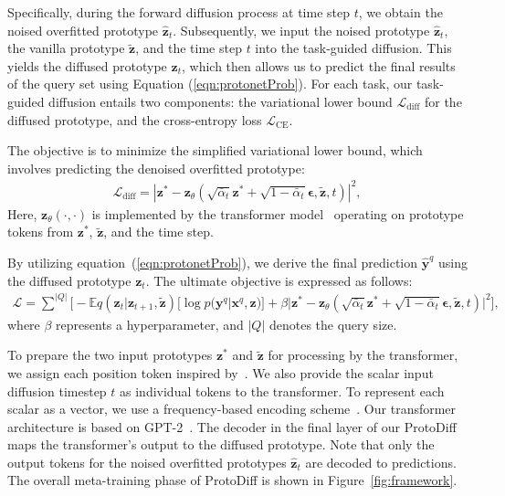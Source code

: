 Specifically, during the forward diffusion process at time step $t$, we obtain the noised overfitted prototype $\hat{\mathbf{z}}_t$. Subsequently, we input the noised prototype $\hat{\mathbf{z}}_t$, the vanilla prototype $\tilde{\mathbf{z}}$, and the time step $t$ into the task-guided diffusion. This yields the diffused prototype $\mathbf{z}_t$, which then allows us to predict the final results of the query set using Equation (\ref{eqn:protonetProb}). For each task, our task-guided diffusion entails two components: the variational lower bound $\mathcal{L}_{\mathrm{diff}}$ for the diffused prototype, and the cross-entropy loss $\mathcal{L}_{\mathrm{CE}}$.

The objective is to minimize the simplified variational lower bound, which involves predicting the denoised overfitted prototype:
\begin{align}
\label{eq:vlb}
\mathcal{L}_{\mathrm{diff}} = |\mathbf{z}^* - \mathbf{z}_\theta(\sqrt{\bar{\alpha}_t}\mathbf{z}^* +\sqrt{1-\bar{\alpha}_t}\boldsymbol{\epsilon}, \tilde{\mathbf{z}}, t)|^2,
\end{align}
Here, $\mathbf{z}_\theta(\cdot, \cdot)$ is implemented by the transformer model~\cite{vaswani2017attention} operating on prototype tokens from $\mathbf{z}^*$, $\tilde{\mathbf{z}}$, and the time step.

By utilizing equation~(\ref{eqn:protonetProb}), we derive the final prediction $\hat{\mathbf{y}}^q$ using the diffused prototype $\mathbf{z}_t$. The ultimate objective is expressed as follows:
\begin{align}
\label{eq:final_loss}
\mathcal{L} = \sum^{|Q|} \Big[ - \mathbb{E}{q(\mathbf{z}_t|\mathbf{z}_{t+1}, \tilde{\mathbf{z}})}\big[\log p(\mathbf{y}^q|\mathbf{x}^q,\mathbf{z})\big] + \beta |\mathbf{z}^* - \mathbf{z}_\theta(\sqrt{\bar{\alpha}_t}\mathbf{z}^* +\sqrt{1-\bar{\alpha}_t}\boldsymbol{\epsilon}, \tilde{\mathbf{z}}, t)|^2\Big],
\end{align}
where $\beta$ represents a hyperparameter, and $|Q|$ denotes the query size.

To prepare the two input prototypes $\mathbf{z}^*$ and $\tilde{\mathbf{z}}$ for processing by the transformer, we assign each position token inspired by~\cite{dosovitskiy2020image}. We also provide the scalar input diffusion timestep $t$ as individual tokens to the transformer. To represent each scalar as a vector, we use a frequency-based encoding scheme~\cite{mildenhall2021nerf}. Our transformer architecture is based on GPT-2~\cite{radford2019language}. The decoder in the final layer of our ProtoDiff maps the transformer's output to the diffused prototype.  Note that only the output tokens for the noised overfitted prototypes $\hat{\mathbf{z}}_t$ are decoded to predictions. The overall meta-training phase of ProtoDiff is shown in Figure~\ref{fig:framework}. 




